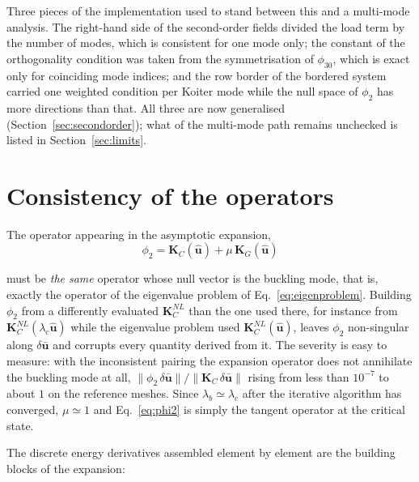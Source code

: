 \documentclass[11pt,a4paper]{article}
\begin{document}
Three pieces of the implementation used to stand between this and a
multi-mode analysis.  The right-hand side of the second-order fields divided
the load term by the number of modes, which is consistent for one mode only;
the constant of the orthogonality condition was taken from the
symmetrisation of $\phi_{30}$, which is exact only for coinciding mode
indices; and the row border of the bordered system carried one weighted
condition per Koiter mode while the null space of $\phi_2$ has more
directions than that.  All three are now generalised
(Section~\ref{sec:secondorder}); what of the multi-mode path remains
unchecked is listed in Section~\ref{sec:limits}.

\section{Consistency of the operators}
\label{sec:consistency}

The operator appearing in the asymptotic expansion,
\begin{equation}\label{eq:phi2}
	\phi_2 = \boldsymbol{K}_C(\boldsymbol{\hat{u}})
	       + \mu\,\boldsymbol{K}_G(\boldsymbol{\hat{u}})
\end{equation}

\noindent must be \emph{the same} operator whose null vector is the buckling
mode, that is, exactly the operator of the eigenvalue problem of
Eq.~\ref{eq:eigenproblem}.  Building $\phi_2$ from a differently evaluated
$\boldsymbol{K}_C^{NL}$ than the one used there, for instance from
$\boldsymbol{K}_C^{NL}(\lambda_c\boldsymbol{\hat{u}})$ while the eigenvalue
problem used $\boldsymbol{K}_C^{NL}(\boldsymbol{\hat{u}})$, leaves $\phi_2$
non-singular along $\delta\boldsymbol{\bar{u}}$ and corrupts every quantity
derived from it.  The severity is easy to measure: with the inconsistent
pairing the expansion operator does not annihilate the buckling mode at all,
$\lVert\phi_2\,\delta\boldsymbol{\bar{u}}\rVert /
\lVert\boldsymbol{K}_C\,\delta\boldsymbol{\bar{u}}\rVert$ rising from less
than $10^{-7}$ to about $1$ on the reference meshes.  Since
$\lambda_b\simeq\lambda_c$ after the iterative algorithm has converged,
$\mu\simeq1$ and Eq.~\ref{eq:phi2} is simply the tangent operator at the
critical state.

The discrete energy derivatives assembled element by element are the building
blocks of the expansion:
\end{document}
